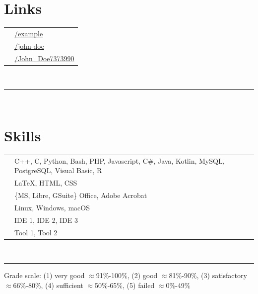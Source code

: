 \documentclass{article}
\begin{document}
{\begin{minipage}[t][\textheight-2\fboxsep-2\fboxrule][t]{\dimexpr0.40\textwidth-2\fboxrule-2\fboxsep\relax}
        \section*{\large Links}
        \begin{tabular}{cl}
            \faGithub{}   & \href{https://github.com/example}{/example} \\
            \faLinkedin{} & \href{https://www.linkedin.com/in/john-doe/}{/john-doe} \\
            \faXing{}     & \href{https://www.xing.com/profile/John_Doe7373990/cv}{/John\_Doe7373990} \\
        \end{tabular}
        \vspace{10pt} \\
        \rule{\linewidth}{0.4pt} \\
        \section*{\large Skills}
        \begin{tabularx}{\textwidth}{cY}
            \faCode{}        & C++, C, Python, Bash, PHP, Javascript, C\#, Java, Kotlin, MySQL, PostgreSQL, Visual Basic, R \\
            \faPen*{}        & \LaTeX, HTML, CSS \\
            \faFont{}        & \{MS, Libre, GSuite\} Office, Adobe Acrobat \\
            \faCogs{}        & Linux, Windows, macOS \\
            \faLaptopCode{}  & IDE 1, IDE 2, IDE 3 \\
            \faToolbox{}     & Tool 1, Tool 2 
        \end{tabularx}
        \vspace{1pt} \\
        \rule{\linewidth}{0.4pt}
        \vfill
        {\tiny Grade scale: (1) very good $\approx$91\%-100\%, (2) good $\approx$81\%-90\%, (3) satisfactory $\approx$66\%-80\%, (4) sufficient $\approx$50\%-65\%, (5) failed $\approx$0\%-49\%}
    \end{minipage}
}
\end{document}
